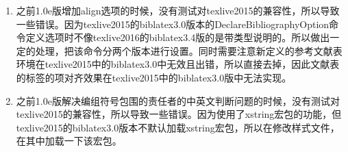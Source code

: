 \begin{enumerate}
\item 之前1.0e版增加align选项的时候，没有测试对texlive2015的兼容性，所以导致一些错误。因为texlive2015的biblatex3.0版本的DeclareBibliographyOption命令定义选项时不像texlive2016的biblatex3.4版的是带类型说明的。所以做出一定的处理，把该命令分两个版本进行设置。同时需要注意新定义的参考文献表环境在texlive2015中的biblatex3.0中无效且出错，所以直接去掉，因此文献表的标签的项对齐效果在texlive2015中的biblatex3.0版中无法实现。

\item 之前1.0e版解决编组符号包围的责任者的中英文判断问题的时候，没有测试对texlive2015的兼容性，所以导致一些错误。因为使用了xstring宏包的功能，但texlive2015的biblatex3.0版本不默认加载xstring宏包，所以在修改样式文件，在其中加载一下该宏包。
\begin{texlist}
\RequirePackage{xstring}%
\end{texlist}

\end{enumerate}

